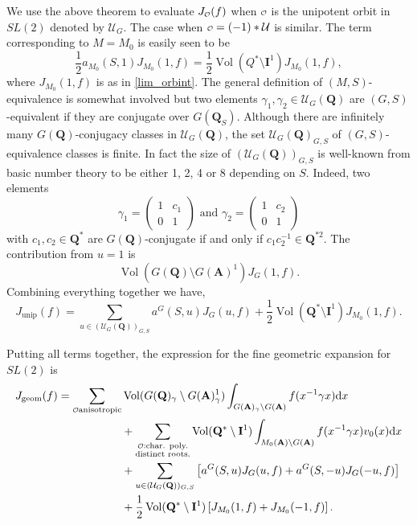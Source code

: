 \documentclass[11pt]{amsart}
\def\A{\mathbf A}
\def\I{\mathbf I}
\def\Q{\mathbf Q}
\def\o{\scalebox{0.8}{$\scriptstyle\mathcal{O}$}}
\def\UUU{\mathcal U}
\def\d{\text d}
\def\bs{\setminus}
\def\vol{\operatorname{Vol}}
\theoremstyle{remark}
\begin{document}
We use the above theorem to evaluate $J_{\o}(f)$ when $\o$ is the unipotent orbit in $SL(2)$ denoted by $\UUU_G$. The case when $\o = (-1)*\UUU$ is similar. The term corresponding to $M=M_0$ is easily seen to be 
\[ \frac{1}{2} a_{M_0}(S, 1) J_{M_0}(1, f) = \frac{1}{2} \vol(Q^*\bs \I^1) J_{M_0}(1, f), \]
where $J_{M_0}(1, f)$ is as in \cref{lim_orbint}. The general definition of $(M, S)$-equivalence is somewhat involved but two elements $\gamma_1, \gamma_2 \in \UUU_G(\Q)$ are $(G, S)$-equivalent if they are conjugate over $G(\Q_S)$. Although there are infinitely many $G(\Q)$-conjugacy classes in $\UUU_G(\Q)$, the set $\UUU_G(\Q)_{G, S}$ of $(G, S)$-equivalence classes is finite. In fact the size of $(\UUU_G(\Q))_{G, S}$ is well-known from basic number theory to be either 1, 2, 4 or 8 depending on $S$. Indeed, two elements
\[ \gamma_1 = \begin{pmatrix} 1 & c_1 \\ 0 & 1 \end{pmatrix} \text{ and } \gamma_2 = \begin{pmatrix} 1 & c_2 \\ 0 & 1 \end{pmatrix}
\]
with $c_1, c_2 \in \Q^*$ are $G(\Q)$-conjugate if and only if $c_1 c_2^{-1} \in \Q^{*2}$. The contribution from $u=1$ is 
\[ \vol(G(\Q)\bs G(\A)^1) J_G(1, f). \]
Combining everything together we have, 
\[ J_{\text{unip}}(f) = \sum_{u \in (\UUU_G(\Q))_{G, S}} a^G(S, u) J_G(u, f) + \frac{1}{2} \vol(\Q^*\bs \I^1) J_{M_0}(1, f). \]

Putting all terms together, the expression for the fine geometric expansion for $SL(2)$ is
\begin{equation} \label{eq:fine_geom}
	\begin{aligned}
		J_{\text{geom}}(f) = \sum_{\o \text{anisotropic}} & \vol(G(\Q)_\gamma \bs G(\A)^1_\gamma) 
					\int_{G(\A)_\gamma \bs G(\A)} f(x^{-1} \gamma x) \d x \\
			& + \sum_{\substack{\o : \text{char. poly.} \\ \text{distinct roots.}}} \vol(\Q^*\bs \I^1) 
					\int_{M_0(\A)\bs G(\A)} f(x^{-1}\gamma x) v_0(x) \d x \\
			& + \sum_{u \in (\UUU_G(\Q))_{G, S}} \left[ a^G(S, u) J_G(u, f) + a^G(S, -u) J_G(-u, f) 
					\right] \\
			& + \frac{1}{2} \vol(\Q^*\bs \I^1) \left[ J_{M_0}(1, f) + J_{M_0}(-1, f) 
					\right]. 
	\end{aligned}
\end{equation}
\end{document}
